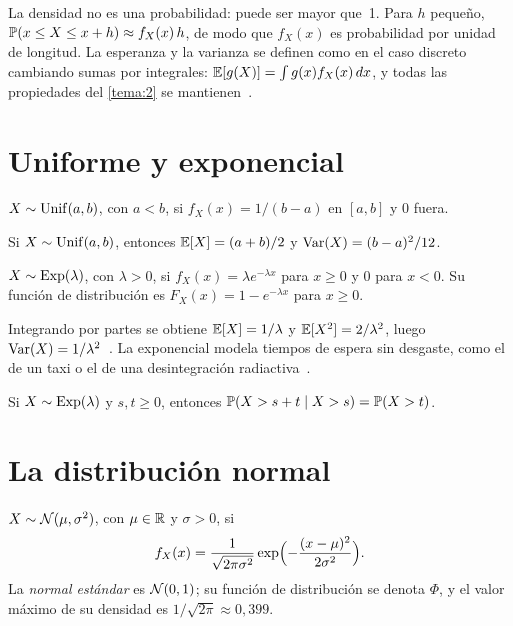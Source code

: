 La densidad no es una probabilidad: puede ser mayor que~1. Para $h$ pequeño, $\mathbb{P}(x\le X\le x+h)\approx f_X(x)\,h$, de modo que $f_X(x)$ es probabilidad por unidad de longitud. La esperanza y la varianza se definen como en el caso discreto cambiando sumas por integrales: $\mathbb{E}[g(X)]=\int g(x)f_X(x)\,dx$, y todas las propiedades del \cref{tema:2} se mantienen~\cite[§3.1]{bt}.

\section{Uniforme y exponencial}

\begin{definicion}[Uniforme]
$X\sim\operatorname{Unif}(a,b)$, con $a<b$, si $f_X(x)=1/(b-a)$ en $[a,b]$ y $0$ fuera.
\end{definicion}

\begin{proposicion}\label{prop:uniforme}
Si $X\sim\operatorname{Unif}(a,b)$, entonces $\mathbb{E}[X]=(a+b)/2$ y $\operatorname{Var}(X)=(b-a)^{2}/12$.
\end{proposicion}

\begin{definicion}[Exponencial]
$X\sim\operatorname{Exp}(\lambda)$, con $\lambda>0$, si $f_X(x)=\lambda e^{-\lambda x}$ para $x\ge 0$ y $0$ para $x<0$. Su función de distribución es $F_X(x)=1-e^{-\lambda x}$ para $x\ge 0$.
\end{definicion}

Integrando por partes se obtiene $\mathbb{E}[X]=1/\lambda$ y $\mathbb{E}[X^{2}]=2/\lambda^{2}$, luego $\operatorname{Var}(X)=1/\lambda^{2}$~\cite[§3.1]{bt}. La exponencial modela tiempos de espera sin desgaste, como el de un taxi o el de una desintegración radiactiva~\cite[clase~5c]{mit1805}.

\begin{proposicion}\label{prop:memoria}
Si $X\sim\operatorname{Exp}(\lambda)$ y $s,t\ge 0$, entonces $\mathbb{P}(X>s+t\mid X>s)=\mathbb{P}(X>t)$.
\end{proposicion}

\section{La distribución normal}

\begin{definicion}[Normal]\label{def:normal}
$X\sim\mathcal{N}(\mu,\sigma^{2})$, con $\mu\in\mathbb{R}$ y $\sigma>0$, si
\[
f_X(x)=\frac{1}{\sqrt{2\pi\sigma^{2}}}\exp\Bigl(-\frac{(x-\mu)^{2}}{2\sigma^{2}}\Bigr).
\]
La \emph{normal estándar} es $\mathcal{N}(0,1)$; su función de distribución se denota $\Phi$, y el valor máximo de su densidad es $1/\sqrt{2\pi}\approx 0{,}399$.
\end{definicion}


